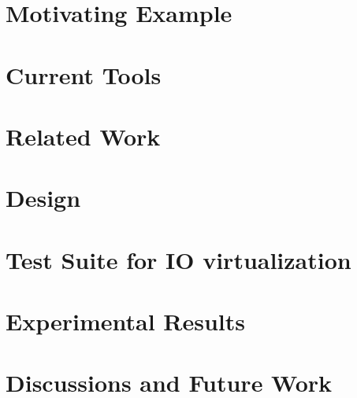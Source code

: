 \documentclass[10pt,onecolumn,oneside]{article}
\begin{document}
\section{Motivating Example}


\section{Current Tools}


\section{Related Work}


\section{Design}


\section{Test Suite for IO virtualization}


\section{Experimental Results}


\section{Discussions and Future Work}



\end{document}
